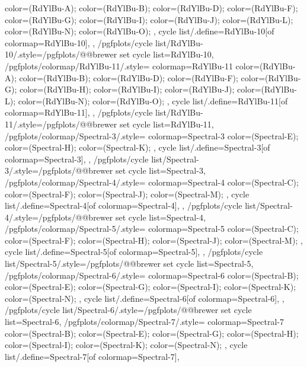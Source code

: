 {{{      color=(RdYlBu-A);
      color=(RdYlBu-B);
      color=(RdYlBu-D);
      color=(RdYlBu-F);
      color=(RdYlBu-G);
      color=(RdYlBu-I);
      color=(RdYlBu-J);
      color=(RdYlBu-L);
      color=(RdYlBu-N);
      color=(RdYlBu-O);
    },
    cycle list/.define={RdYlBu-10}{[of colormap=RdYlBu-10]},
  },
  /pgfplots/cycle list/RdYlBu-10/.style={/pgfplots/@@brewer set cycle list={RdYlBu-10}},
  /pgfplots/colormap/RdYlBu-11/.style={
    colormap={RdYlBu-11}{
      color=(RdYlBu-A);
      color=(RdYlBu-B);
      color=(RdYlBu-D);
      color=(RdYlBu-F);
      color=(RdYlBu-G);
      color=(RdYlBu-H);
      color=(RdYlBu-I);
      color=(RdYlBu-J);
      color=(RdYlBu-L);
      color=(RdYlBu-N);
      color=(RdYlBu-O);
    },
    cycle list/.define={RdYlBu-11}{[of colormap=RdYlBu-11]},
  },
  /pgfplots/cycle list/RdYlBu-11/.style={/pgfplots/@@brewer set cycle list={RdYlBu-11}},
  /pgfplots/colormap/Spectral-3/.style={
    colormap={Spectral-3}{
      color=(Spectral-E);
      color=(Spectral-H);
      color=(Spectral-K);
    },
    cycle list/.define={Spectral-3}{[of colormap=Spectral-3]},
  },
  /pgfplots/cycle list/Spectral-3/.style={/pgfplots/@@brewer set cycle list={Spectral-3}},
  /pgfplots/colormap/Spectral-4/.style={
    colormap={Spectral-4}{
      color=(Spectral-C);
      color=(Spectral-F);
      color=(Spectral-J);
      color=(Spectral-M);
    },
    cycle list/.define={Spectral-4}{[of colormap=Spectral-4]},
  },
  /pgfplots/cycle list/Spectral-4/.style={/pgfplots/@@brewer set cycle list={Spectral-4}},
  /pgfplots/colormap/Spectral-5/.style={
    colormap={Spectral-5}{
      color=(Spectral-C);
      color=(Spectral-F);
      color=(Spectral-H);
      color=(Spectral-J);
      color=(Spectral-M);
    },
    cycle list/.define={Spectral-5}{[of colormap=Spectral-5]},
  },
  /pgfplots/cycle list/Spectral-5/.style={/pgfplots/@@brewer set cycle list={Spectral-5}},
  /pgfplots/colormap/Spectral-6/.style={
    colormap={Spectral-6}{
      color=(Spectral-B);
      color=(Spectral-E);
      color=(Spectral-G);
      color=(Spectral-I);
      color=(Spectral-K);
      color=(Spectral-N);
    },
    cycle list/.define={Spectral-6}{[of colormap=Spectral-6]},
  },
  /pgfplots/cycle list/Spectral-6/.style={/pgfplots/@@brewer set cycle list={Spectral-6}},
  /pgfplots/colormap/Spectral-7/.style={
    colormap={Spectral-7}{
      color=(Spectral-B);
      color=(Spectral-E);
      color=(Spectral-G);
      color=(Spectral-H);
      color=(Spectral-I);
      color=(Spectral-K);
      color=(Spectral-N);
    },
    cycle list/.define={Spectral-7}{[of colormap=Spectral-7]},
}}
